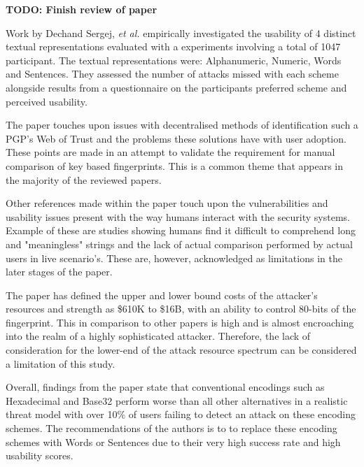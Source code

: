 \textbf{TODO: Finish review of paper}

\newpage
Work by Dechand Sergej, \textit{et al.}\cite{dechand2016empirical} empirically investigated the usability of 4 distinct textual representations evaluated with a experiments involving a total of 1047 participant. The textual representations were: Alphanumeric, Numeric, Words and Sentences. They assessed the number of attacks missed with each scheme alongside results from a questionnaire on the participants preferred scheme and perceived usability.

The paper touches upon issues with decentralised methods of identification such a PGP's Web of Trust and the problems these solutions have with user adoption. These points are made in an attempt to validate the requirement for manual comparison of key based fingerprints. This is a common theme that appears in the majority of the reviewed papers.

Other references made within the paper touch upon the vulnerabilities and usability issues present with the way humans interact with the security systems. Example of these are studies showing humans find it difficult to comprehend long and "meaningless" strings and the lack of actual comparison performed by actual users in live scenario's. These are, however, acknowledged as limitations in the later stages of the paper.

The paper has defined the upper and lower bound costs of the attacker's resources and strength as \$610K to \$16B, with an ability to control 80-bits of the fingerprint. This in comparison to other papers is high and is almost encroaching into the realm of a highly sophisticated attacker. Therefore, the lack of consideration for the lower-end of the attack resource spectrum can be considered a limitation of this study.

Overall, findings from the paper state that conventional encodings such as Hexadecimal and Base32 perform worse than all other alternatives in a realistic threat model with over 10\% of users failing to detect an attack on these encoding schemes. The recommendations of the authors is to to replace these encoding schemes with Words or Sentences due to their very high success rate and high usability scores.
